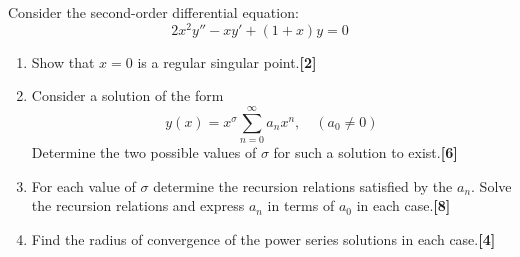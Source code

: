 \documentclass[a4paper]{article}
\begin{document}
\newpage
\begin{qns}
Consider the second-order differential equation:
$$2x^2y''-xy'+(1+x)y=0$$
\begin{enumerate}[label=(\alph*)]
\item Show that $x = 0$ is a regular singular point.\hfill\textbf{[2]}
\item Consider a solution of the form
$$y(x)=x^\sigma\sum_{n=0}^\infty a_nx^n,\quad (a_0\neq 0)$$
Determine the two possible values of $\sigma$ for such a solution to exist.\hfill\textbf{[6]}
\item For each value of $\sigma$ determine the recursion relations satisfied by the $a_n$. Solve the recursion relations and express $a_n$ in terms of $a_0$ in each case.\hfill\textbf{[8]}
\item Find the radius of convergence of the power series solutions in each case.\hfill\textbf{[4]}
\end{enumerate}
\end{qns}
\end{document}
